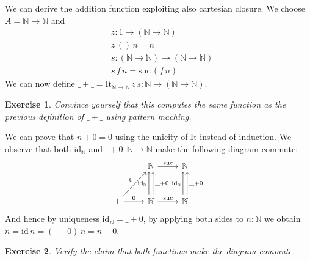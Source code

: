 \documentclass{article}
\newcommand{\id}{\mathrm{id}}
\newcommand{\Nat}{\mathbb{N}}
\newcommand{\suc}{\mathrm{suc}}
\newcommand{\It}{\mathrm{It}}
\newtheorem{exercise}{Exercise}
\begin{document}
We can derive the addition function exploiting also cartesian closure. We choose $A = \Nat \to \Nat$ and
\begin{align*}
& z : 1 \to (\Nat \to \Nat) \\
& z\,()\,n = n \\
& s : (\Nat \to \Nat) \to (\Nat \to \Nat) \\
& s\,f\,n = \suc\,(f\,n)
\end{align*}
We can now define $\_+\_ = \It_{\Nat\to\Nat}\,z\,s : \Nat \to (\Nat \to \Nat)$.
\begin{exercise}
  Convince yourself that this computes the same function as the previous definition of $\_+\_$ using pattern maching.
\end{exercise}

We can prove that $n + 0 = 0$ using the unicity of $\It$ instead of induction. We observe that both $\id_\Nat$ and $\_+0 : \Nat \to \Nat$ make the following diagram commute:
\[\begin{tikzcd}[row sep = large]
& \Nat \arrow[r,"\suc"] & \Nat \\
1 \arrow[ur,"0"] \arrow[r,"0"] & \Nat \arrow[r,"\suc"] \arrow[u, shift left,"\id_\Nat" left] 
\arrow[u,shift right, "\_+0" right]
& \Nat  \arrow[u,shift left,"\id_\Nat" left]\arrow[u,shift right,"\_+0" right]
\end{tikzcd}\]  
And hence by uniqueness $\id_\Nat = \_+0$, by applying both sides to $n:\Nat$ we obtain 
$n = \id\,n = (\_ + 0)\,n = n + 0$. 
\begin{exercise}
  Verify the claim that both functions make the diagram commute.
\end{exercise}
\end{document}
